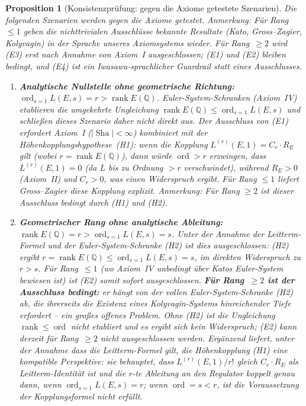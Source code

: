 \documentclass[aps,prd,twocolumn,superscriptaddress,nofootinbib,floatfix]{revtex4-2}
\newtheorem{proposition}[theorem]{Proposition}
\theoremstyle{definition}
\theoremstyle{remark}
\DeclareMathOperator{\ord}{ord}
\DeclareMathOperator{\rank}{rank}
\DeclareMathOperator{\Sha}{Sha}
\begin{document}
\begin{proposition}[Konsistenzprüfung: gegen die Axiome getestete Szenarien]
\label{prop:exclusion}
Die folgenden Szenarien werden gegen die Axiome getestet. \textit{Anmerkung:} Für Rang~$\leq 1$ geben die nichttrivialen Ausschlüsse bekannte Resultate (Kato, Gross--Zagier, Kolyvagin) in der Sprache unseres Axiomsystems wieder. Für Rang~$\geq 2$ wird (E3) erst nach Annahme von Axiom~I ausgeschlossen; (E1) und (E2) bleiben bedingt, und (E4) ist ein Iwasawa-sprachlicher Guardrail statt eines Ausschlusses.

\begin{enumerate}
\item[\textbf{(E1)}] \textbf{Analytische Nullstelle ohne geometrische Richtung:} $\ord_{s=1} L(E,s) = r > \rank E(\mathbb{Q})$. Euler-System-Schranken (Axiom~IV) etablieren die \textit{umgekehrte} Ungleichung $\rank E(\mathbb{Q}) \leq \ord_{s=1} L(E,s)$ und schließen dieses Szenario daher nicht direkt aus. Der Ausschluss von (E1) erfordert Axiom~I ($|\Sha| < \infty$) kombiniert mit der Höhenkopplungshypothese~(H1): wenn die Kopplung $L^{(r)}(E,1) = C_r \cdot R_E$ gilt (wobei $r = \rank E(\mathbb{Q})$), dann würde $\ord > r$ erzwingen, dass $L^{(r)}(E,1) = 0$ (da $L$ bis zu Ordnung $> r$ verschwindet), während $R_E > 0$ (Axiom~II) und $C_r > 0$, was einen Widerspruch ergibt. Für Rang $\leq 1$ liefert Gross--Zagier diese Kopplung explizit. \textit{Anmerkung:} Für Rang $\geq 2$ ist dieser Ausschluss bedingt durch (H1) und (H2).

\item[\textbf{(E2)}] \textbf{Geometrischer Rang ohne analytische Ableitung:} $\rank E(\mathbb{Q}) = r > \ord_{s=1} L(E,s) = s$. \textit{Unter der Annahme der Leitterm-Formel} und der Euler-System-Schranke (H2) ist dies ausgeschlossen: (H2) ergibt $r = \rank E(\mathbb{Q}) \leq \ord_{s=1} L(E,s) = s$, im direkten Widerspruch zu $r > s$. Für Rang~$\leq 1$ (wo Axiom~IV unbedingt über Katos Euler-System bewiesen ist) ist (E2) somit sofort ausgeschlossen. \textbf{Für Rang~$\geq 2$ ist der Ausschluss bedingt:} er hängt von der vollen Euler-System-Schranke (H2) ab, die ihrerseits die Existenz eines Kolyvagin-Systems hinreichender Tiefe erfordert -- ein großes offenes Problem. Ohne (H2) ist die Ungleichung $\rank \leq \ord$ nicht etabliert und es ergibt sich kein Widerspruch; (E2) \textit{kann derzeit für Rang~$\geq 2$ nicht ausgeschlossen werden}. Ergänzend liefert, unter der Annahme dass die Leitterm-Formel gilt, die Höhenkopplung (H1) eine kompatible Perspektive: sie behauptet, dass $L^{(r)}(E,1)/r!$ gleich $C_r \cdot R_E$ als \textit{Leitterm-Identität} ist und die $r$-te Ableitung an den Regulator koppelt genau dann, wenn $\ord_{s=1} L(E,s) = r$; wenn $\ord = s < r$, ist die Voraussetzung der Kopplungsformel nicht erfüllt.


\end{enumerate}
\end{proposition}
\end{document}

